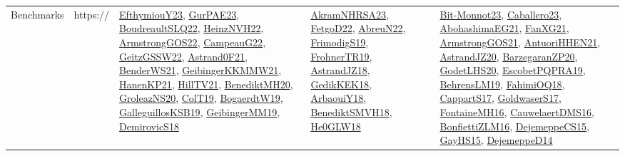 {\begin{longtable}{lp{3cm}>{\raggedright}p{6cm}>{\raggedright}p{6cm}p{8cm}}
Benchmarks & https:// & \href{papers/EfthymiouY23.pdf}{EfthymiouY23}\cite{EfthymiouY23}, \href{articles/GurPAE23.pdf}{GurPAE23}\cite{GurPAE23}, \href{papers/BoudreaultSLQ22.pdf}{BoudreaultSLQ22}\cite{BoudreaultSLQ22}, \href{articles/HeinzNVH22.pdf}{HeinzNVH22}\cite{HeinzNVH22}, \href{papers/ArmstrongGOS22.pdf}{ArmstrongGOS22}\cite{ArmstrongGOS22}, \href{articles/CampeauG22.pdf}{CampeauG22}\cite{CampeauG22}, \href{papers/GeitzGSSW22.pdf}{GeitzGSSW22}\cite{GeitzGSSW22}, \href{papers/Astrand0F21.pdf}{Astrand0F21}\cite{Astrand0F21}, \href{papers/BenderWS21.pdf}{BenderWS21}\cite{BenderWS21}, \href{papers/GeibingerKKMMW21.pdf}{GeibingerKKMMW21}\cite{GeibingerKKMMW21}, \href{papers/HanenKP21.pdf}{HanenKP21}\cite{HanenKP21}, \href{papers/HillTV21.pdf}{HillTV21}\cite{HillTV21}, \href{articles/BenediktMH20.pdf}{BenediktMH20}\cite{BenediktMH20}, \href{papers/GroleazNS20.pdf}{GroleazNS20}\cite{GroleazNS20}, \href{papers/ColT19.pdf}{ColT19}\cite{ColT19}, \href{papers/BogaerdtW19.pdf}{BogaerdtW19}\cite{BogaerdtW19}, \href{papers/GalleguillosKSB19.pdf}{GalleguillosKSB19}\cite{GalleguillosKSB19}, \href{papers/GeibingerMM19.pdf}{GeibingerMM19}\cite{GeibingerMM19}, \href{papers/DemirovicS18.pdf}{DemirovicS18}\cite{DemirovicS18} & \href{articles/AkramNHRSA23.pdf}{AkramNHRSA23}\cite{AkramNHRSA23}, \href{articles/FetgoD22.pdf}{FetgoD22}\cite{FetgoD22}, \href{articles/AbreuN22.pdf}{AbreuN22}\cite{AbreuN22}, \href{papers/FrimodigS19.pdf}{FrimodigS19}\cite{FrimodigS19}, \href{papers/FrohnerTR19.pdf}{FrohnerTR19}\cite{FrohnerTR19}, \href{papers/AstrandJZ18.pdf}{AstrandJZ18}\cite{AstrandJZ18}, \href{articles/GedikKEK18.pdf}{GedikKEK18}\cite{GedikKEK18}, \href{papers/ArbaouiY18.pdf}{ArbaouiY18}\cite{ArbaouiY18}, \href{papers/BenediktSMVH18.pdf}{BenediktSMVH18}\cite{BenediktSMVH18}, \href{papers/He0GLW18.pdf}{He0GLW18}\cite{He0GLW18} & \href{papers/Bit-Monnot23.pdf}{Bit-Monnot23}\cite{Bit-Monnot23}, \href{articles/Caballero23.pdf}{Caballero23}\cite{Caballero23}, \href{articles/AbohashimaEG21.pdf}{AbohashimaEG21}\cite{AbohashimaEG21}, \href{articles/FanXG21.pdf}{FanXG21}\cite{FanXG21}, \href{papers/ArmstrongGOS21.pdf}{ArmstrongGOS21}\cite{ArmstrongGOS21}, \href{papers/AntuoriHHEN21.pdf}{AntuoriHHEN21}\cite{AntuoriHHEN21}, \href{articles/AstrandJZ20.pdf}{AstrandJZ20}\cite{AstrandJZ20}, \href{papers/BarzegaranZP20.pdf}{BarzegaranZP20}\cite{BarzegaranZP20}, \href{papers/GodetLHS20.pdf}{GodetLHS20}\cite{GodetLHS20}, \href{articles/EscobetPQPRA19.pdf}{EscobetPQPRA19}\cite{EscobetPQPRA19}, \href{papers/BehrensLM19.pdf}{BehrensLM19}\cite{BehrensLM19}, \href{articles/FahimiOQ18.pdf}{FahimiOQ18}\cite{FahimiOQ18}, \href{papers/CappartS17.pdf}{CappartS17}\cite{CappartS17}, \href{papers/GoldwaserS17.pdf}{GoldwaserS17}\cite{GoldwaserS17}, \href{papers/FontaineMH16.pdf}{FontaineMH16}\cite{FontaineMH16}, \href{papers/CauwelaertDMS16.pdf}{CauwelaertDMS16}\cite{CauwelaertDMS16}, \href{papers/BonfiettiZLM16.pdf}{BonfiettiZLM16}\cite{BonfiettiZLM16}, \href{papers/DejemeppeCS15.pdf}{DejemeppeCS15}\cite{DejemeppeCS15}, \href{papers/GayHS15.pdf}{GayHS15}\cite{GayHS15}, \href{papers/DejemeppeD14.pdf}{DejemeppeD14}\cite{DejemeppeD14}\\

\end{longtable}}
